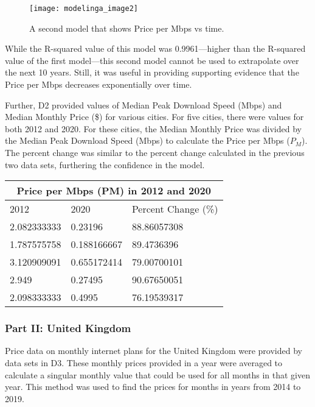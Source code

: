 	
	\begin{figure}[htp]
    \centering
    \begin{minipage}{9cm}
    \texttt{[image: modelinga\_image2]}
    \caption{A second model that shows Price per Mbps vs time.}
    \label{fig:2}
    \end{minipage}
    \end{figure}
	
	While the R-squared value of this model was 0.9961—higher than the R-squared value of the first model—this second model cannot be used to extrapolate over the next 10 years. Still, it was useful in providing supporting evidence that the Price per Mbps decreases exponentially over time.

    Further, D2 provided values of Median Peak Download Speed (Mbps) and Median Monthly Price (\$) for various cities. For five cities, there were values for both 2012 and 2020. For these cities, the Median Monthly Price was divided by the Median Peak Download Speed (Mbps) to calculate the Price per Mbps ($P_M$). The percent change was similar to the percent change calculated in the previous two data sets, furthering the confidence in the model.
	
	
	\begin{center}
\begin{tabular}{|l|l|l|}
\hline
\multicolumn{3}{|c|}{Price per Mbps (PM) in 2012 and 2020} \\ \hline
2012            & 2020            & Percent Change (\%)    \\ \hline
2.082333333     & 0.23196         & 88.86057308            \\ \hline
1.787575758     & 0.188166667     & 89.4736396             \\ \hline
3.120909091     & 0.655172414     & 79.00700101            \\ \hline
2.949           & 0.27495         & 90.67650051            \\ \hline
2.098333333     & 0.4995          & 76.19539317            \\ \hline
\end{tabular}
\end{center}
	
    \subsubsection{Part II: United Kingdom}
    
    Price data on monthly internet plans for the United Kingdom were provided by data sets in D3. These monthly prices provided in a year were averaged to calculate a singular monthly value that could be used for all months in that given year. This method was used to find the prices for months in years from 2014 to 2019.

